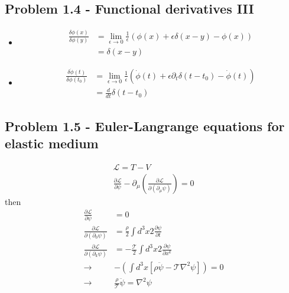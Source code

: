 \documentclass[10pt,a4paper]{book}
\theoremstyle{definition}
\begin{document}
\subsection{Problem 1.4 - Functional derivatives III}
\begin{itemize}
\item
\begin{align}
\frac{\delta\phi(x)}{\delta\phi(y)}
&=\lim_{\epsilon\rightarrow0}\frac{1}{\epsilon}\left(\phi(x)+\epsilon\delta(x-y)-\phi(x)\right)\\
&=\delta(x-y)
\end{align}
\item
\begin{align}
\frac{\delta\dot\phi(t)}{\delta\phi(t_0)}
&=\lim_{\epsilon\rightarrow0}\frac{1}{\epsilon}\left(\dot\phi(t)+\epsilon\partial_t\delta(t-t_0)-\dot\phi(t)\right)\\
&=\frac{d}{dt}\delta(t-t_0)
\end{align}
\end{itemize}

\subsection{Problem 1.5 - Euler-Langrange equations for elastic medium}
\begin{align}
\mathcal{L}=T-V\\
\frac{\partial\mathcal{L}}{\partial\psi}-\partial_\mu\left(\frac{\partial\mathcal{L}}{\partial(\partial_\mu\psi)}\right)=0
\end{align}
then
\begin{align}
\frac{\partial\mathcal{L}}{\partial\psi}&=0\\
\frac{\partial\mathcal{L}}{\partial(\partial_0\psi)}&=\frac{\rho}{2}\int d^3x 2\frac{\partial\psi}{\partial t}\\
\frac{\partial\mathcal{L}}{\partial(\partial_k\psi)}&=-\frac{\mathcal{T}}{2}\int d^3x 2\frac{\partial\psi}{\partial x^k}\\
\rightarrow&-\left(\int d^3x[\rho\ddot\psi-\mathcal{T}\nabla^2\psi]\right)=0\\
\rightarrow&\frac{\rho}{\mathcal{T}}\ddot\psi=\nabla^2\psi
\end{align}
\end{document}
